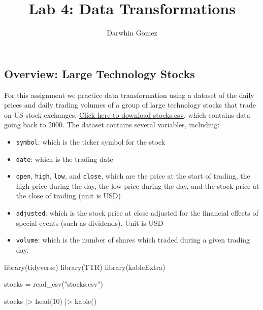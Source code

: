 \documentclass[
  letterpaper,
  DIV=11,
  numbers=noendperiod]{scrartcl}
\title{Lab 4: Data Transformations}
\author{Darwhin Gomez}
\date{}
\newenvironment{Shaded}{\begin{snugshade}}{\end{snugshade}}
\newcommand{\DecValTok}[1]{\textcolor[rgb]{0.68,0.00,0.00}{#1}}
\newcommand{\FunctionTok}[1]{\textcolor[rgb]{0.28,0.35,0.67}{#1}}
\newcommand{\NormalTok}[1]{\textcolor[rgb]{0.00,0.23,0.31}{#1}}
\newcommand{\OtherTok}[1]{\textcolor[rgb]{0.00,0.23,0.31}{#1}}
\newcommand{\SpecialCharTok}[1]{\textcolor[rgb]{0.37,0.37,0.37}{#1}}
\newcommand{\StringTok}[1]{\textcolor[rgb]{0.13,0.47,0.30}{#1}}
\providecommand{\tightlist}{%
  \setlength{\itemsep}{0pt}\setlength{\parskip}{0pt}}\usepackage{longtable,booktabs,array}
\begin{document}
\maketitle

\subsection{Overview: Large Technology
Stocks}\label{overview-large-technology-stocks}

For this assignment we practice data transformation using a dataset of
the daily prices and daily trading volumes of a group of large
technology stocks that trade on US stock exchanges.
\href{https://github.com/georgehagstrom/DATA607/tree/main/website/assignments/labs/labData/stocks.csv}{Click
here to download stocks.csv}, which contains data going back to 2000.
The dataset contains several variables, including:

\begin{itemize}
\tightlist
\item
  \texttt{symbol}: which is the ticker symbol for the stock
\item
  \texttt{date}: which is the trading date
\item
  \texttt{open}, \texttt{high}, \texttt{low}, and \texttt{close}, which
  are the price at the start of trading, the high price during the day,
  the low price during the day, and the stock price at the close of
  trading (unit is USD)
\item
  \texttt{adjusted}: which is the stock price at close adjusted for the
  financial effects of special events (such as dividends). Unit is USD
\item
  \texttt{volume}: which is the number of shares which traded during a
  given trading day.
\end{itemize}

\begin{Shaded}
\begin{Highlighting}[]
\FunctionTok{library}\NormalTok{(tidyverse)}
\FunctionTok{library}\NormalTok{(TTR)}
\FunctionTok{library}\NormalTok{(kableExtra)}

\NormalTok{stocks }\OtherTok{=} \FunctionTok{read\_csv}\NormalTok{(}\StringTok{"stocks.csv"}\NormalTok{)}

\NormalTok{stocks }\SpecialCharTok{|\textgreater{}} \FunctionTok{head}\NormalTok{(}\DecValTok{10}\NormalTok{) }\SpecialCharTok{|\textgreater{}} \FunctionTok{kable}\NormalTok{()}
\end{Highlighting}
\end{Shaded}
\end{document}

